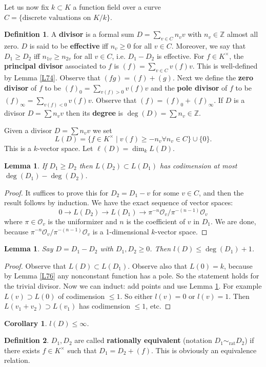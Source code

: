 \documentclass{article}
\newcommand{\Z}{\mathbb{Z}}
\theoremstyle{plain}
\newtheorem{lem}[thm]{Lemma}
\newtheorem*{cor*}{Corollary}
\theoremstyle{definition}
\newtheorem{defn}{Definition}
\theoremstyle{remark}
\begin{document}
Let us now fix $k\subset K$ a function field over a curve $C=\{\text{discrete valuations on }K/k\}$.

\begin{defn}
A \textbf{divisor} is a formal sum $D=\sum_{v\in C}n_v v$ with $n_v\in\Z$ almost all zero. $D$ is said to be \textbf{effective} iff $n_v\geq0$ for all $v\in C$. Moreover, we say that $D_1\geq D_2$ iff $n_{1v}\geq n_{2v}$ for all $v\in C$, i.e. $D_1-D_2$ is effective. For $f\in K^\times$, the \textbf{principal divisor} associated to $f$ is $(f)=\sum_{v\in C}v(f)v$. This is well-defined by Lemma \ref{L74}. Observe that $(fg)=(f)+(g)$. Next we define the \textbf{zero divisor} of $f$ to be $(f)_0=\sum_{v(f)>0} v(f)v$ and the \textbf{pole divisor} of $f$ to be $(f)_\infty=\sum_{v(f)<0}v(f)v$. Observe that $(f)=(f)_0+(f)_\infty$. If $D$ is a divisor $D=\sum n_vv$ then its \textbf{degree} is $\deg(D)=\sum n_v\in\Z$.

Given a divisor $D=\sum n_vv$ we set
\[L(D)=\{f\in K^\times \mid v(f)\geq -n_v \forall n_v\in C\}\cup\{0\}.\]
This is a $k$-vector space. Let $\ell(D)=\dim_k L(D)$.
\end{defn}
  
\begin{lem}
\label{L77}
If $D_1\geq D_2$ then $L(D_2)\subset L(D_1)$ has codimension at most $\deg(D_1)-\deg(D_2)$.
\end{lem}
\begin{proof}
It suffices to prove this for $D_2 = D_1 - v$ for some $v\in C$, and then the result follows by induction. We have the exact sequence of vector spaces:
\[     0 \to L(D_2) \to L(D_1) \to \pi^{-n}\mathcal{O}_v/\pi^{-(n-1)}\mathcal{O}_v        \]
where $\pi \in \mathcal{O}_v$ is the uniformizer and $n$ is the coefficient of $v$ in $D_1$. We are done, because $\pi^{-n}\mathcal{O}_v/\pi^{-(n-1)}\mathcal{O}_v$ is a 1-dimensional $k$-vector space.
\end{proof}

\begin{lem}
\label{L78}
Say $D = D_1 - D_2$ with $D_1, D_2 \geq 0$. Then $l(D) \leq \deg(D_1) + 1$.
\end{lem}
\begin{proof}
Observe that $L(D) \subset L(D_1)$. Observe also that $L(0) = k$, because by Lemma \ref{L76} any nonconstant function has a pole. So the statement holds for the trivial divisor. Now we can induct: add points and use Lemma \ref{L77}. For example $L(v) \supset L(0)$ of codimension $\leq 1$. So either $l(v) = 0$ or $l(v) = 1$. Then $L(v_1 + v_2) \supset L(v_1)$ has codimension $\leq 1$, etc.
\end{proof}
\begin{cor*}
$l(D) \leq \infty$.
\end{cor*}
\begin{defn}
$D_1, D_2$ are called \textbf{rationally equivalent} (notation $D_1 \sim_{\text{rat}} D_2$) if there exists $f \in K^{\times}$ such that $D_1 = D_2 + (f)$. This is obviously an equivalence relation.
\end{defn}
\end{document}
